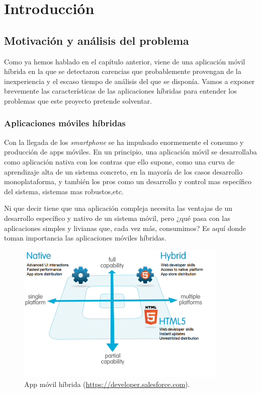 \chapter{Introducción}

\section{Motivación y análisis del problema}
\bigskip
Como ya hemos hablado en el capítulo anterior, {\titulo} viene de una aplicación móvil híbrida en la que se detectaron carencias que probablemente provengan de la inexperiencia y el escaso tiempo de análisis del que se disponía. Vamos a exponer brevemente las características de las aplicaciones híbridas para entender los problemas que este proyecto pretende solventar.

\subsection{Aplicaciones móviles híbridas}
Con la llegada de los \textit{smartphone} se ha impulsado enormemente el consumo y producción de apps móviles. En un principio, una aplicación móvil se desarrollaba como aplicación nativa con los contras que ello supone, como una curva de aprendizaje alta de un sistema concreto, en la mayoría de los casos desarrollo monoplataforma, y también los pros como un desarrollo y control mas específico del sistema, sistemas mas robustos,etc.

\bigskip
Ni que decir tiene que una aplicación compleja necesita las ventajas de un desarrollo específico y nativo de un sistema móvil, pero ¿qué pasa con las aplicaciones simples y livianas que, cada vez más, consumimos? Es aquí donde toman importancia las aplicaciones móviles híbridas.

\begin{figure}[!ht]
  \begin{center}
  \includegraphics[width=0.9\textwidth]{../images/compare_hybrid_app.png}
  \caption[App híbrida]{App móvil híbrida (\href{https://developer.salesforce.com}{https://developer.salesforce.com}).}
  \label{fig:compare_hybrid_app}
  \end{center}
\end{figure}

